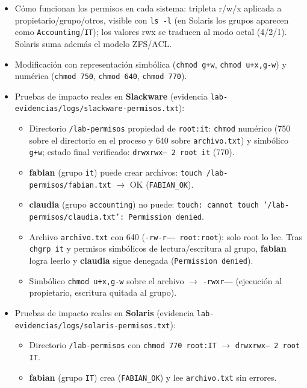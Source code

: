 \documentclass[11pt,a4paper]{report}
\begin{document}
\begin{itemize}
  \item Cómo funcionan los permisos en cada sistema: tripleta r/w/x aplicada a propietario/grupo/otros, visible con \texttt{ls -l} (en Solaris los grupos aparecen como \texttt{Accounting}/\texttt{IT}); los valores rwx se traducen al modo octal (4/2/1). Solaris suma además el modelo ZFS/ACL.
  \item Modificación con representación simbólica (\texttt{chmod g+w}, \texttt{chmod u+x,g-w}) y numérica (\texttt{chmod 750}, \texttt{chmod 640}, \texttt{chmod 770}).
  \item Pruebas de impacto reales en \textbf{Slackware} (evidencia \texttt{lab-evidencias/logs/\allowbreak slackware-permisos.txt}):
    \begin{itemize}
      \item Directorio \texttt{/lab-permisos} propiedad de \texttt{root:it}: \texttt{chmod} numérico (750 sobre el directorio en el proceso y 640 sobre \texttt{archivo.txt}) y simbólico \texttt{g+w}; estado final verificado: \texttt{drwxrwx--- 2 root it} (770).
      \item \textbf{fabian} (grupo \texttt{it}) puede crear archivos: \texttt{touch /lab-permisos/fabian.txt} $\rightarrow$ OK (\texttt{FABIAN\_OK}).
      \item \textbf{claudia} (grupo \texttt{accounting}) no puede: \texttt{touch: cannot touch '/lab-permisos/claudia.txt': Permission denied}.
      \item Archivo \texttt{archivo.txt} con 640 (\texttt{-rw-r----- root:root}): solo root lo lee. Tras \texttt{chgrp it} y permisos simbólicos de lectura/escritura al grupo, \textbf{fabian} logra leerlo y \textbf{claudia} sigue denegada (\texttt{Permission denied}).
      \item Simbólico \texttt{chmod u+x,g-w} sobre el archivo $\rightarrow$ \texttt{-rwxr-----} (ejecución al propietario, escritura quitada al grupo).
    \end{itemize}
  \item Pruebas de impacto reales en \textbf{Solaris} (evidencia \texttt{lab-evidencias/logs/\allowbreak solaris-permisos.txt}):
    \begin{itemize}
      \item Directorio \texttt{/lab-permisos} con \texttt{chmod 770 root:IT} $\rightarrow$ \texttt{drwxrwx--- 2 root IT}.
      \item \textbf{fabian} (grupo \texttt{IT}) crea (\texttt{FABIAN\_OK}) y lee \texttt{archivo.txt} sin errores.

\end{itemize}
\end{itemize}
\end{document}
